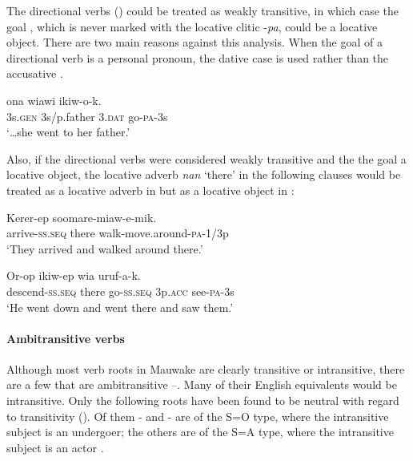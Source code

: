 The directional verbs () could be treated as weakly transitive, in which case the goal , which is never marked with the locative clitic -\textit{pa}, could be a locative object. There are two main reasons against this analysis. When the goal of a directional verb is a personal pronoun, the dative case is used rather than the accusative .

\ea%
\label{ex:3:x1870}
\gll {\dots}ona wiawi  ikiw-o-k. \\
3s.\textsc{gen} 3s/p.father 3.\textsc{dat} go-\textsc{pa}-3s\\
\glt`{\dots}she went to her father.'
\z

Also, if the directional verbs were considered weakly transitive and the the goal a locative object, the locative adverb \textit{nan} `there' in the following clauses would be treated as a locative adverb in  but as a locative object in :

\ea%
\label{ex:3:x1871}
\gll Kerer-ep  soomare-miaw-e-mik. \\
arrive-\textsc{ss}.\textsc{seq} there walk-move.around-\textsc{pa}-1/3p\\
\glt`They arrived and walked around there.'
\z

\ea%
\label{ex:3:x1872}
\gll Or-op  ikiw-ep wia uruf-a-k. \\
descend-\textsc{ss}.\textsc{seq} there go-\textsc{ss}.\textsc{seq} 3p.\textsc{acc} see-\textsc{pa}-3s\\
\glt`He went down and went there and saw them.'
\z


\paragraph{Ambitransitive verbs}\label{sec:3.8.4.2.3}
{}
Although most verb roots in Mauwake are clearly transitive or intransitive, there are a few that are ambitransitive --. Many of their English equivalents would be intransitive. Only the following roots have been found to be neutral with regard to transitivity (). Of them - and - are of the S=O type, where the intransitive subject is an undergoer; the others are of the S=A type, where the intransitive subject is an actor \citep[124]{Dixon2010b}.

